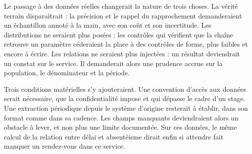 Le passage à des données réelles changerait la nature de trois choses. La vérité terrain
disparaîtrait : la précision et le rappel du rapprochement demanderaient un échantillon annoté à la
main, avec son coût et son incertitude. Les distributions ne seraient plus posées : les contrôles qui
vérifient que la chaîne retrouve un paramètre céderaient la place à des contrôles de forme, plus
faibles et encore à écrire. Les relations ne seraient plus injectées : un résultat deviendrait un
constat sur le service. Il demanderait alors une prudence accrue sur la population, le dénominateur
et la période.

Trois conditions matérielles s'y ajouteraient. Une convention d'accès aux données serait nécessaire,
que la confidentialité impose et qui dépasse le cadre d'un stage. Une extraction périodique depuis le
système d'origine resterait à établir, dans son format comme dans sa cadence. Les champs manquants
deviendraient alors un obstacle à lever, et non plus une limite documentée. Sur ces données, le même
calcul de la relation entre délai et absentéisme dirait enfin si attendre fait manquer un
rendez-vous dans ce service.
